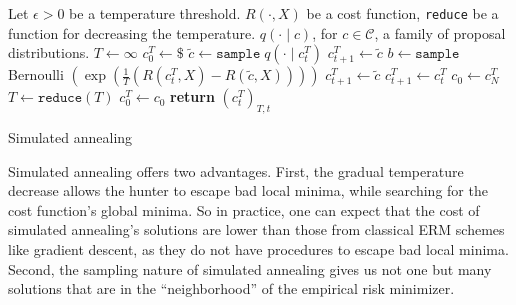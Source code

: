 \begin{algorithm}
\begin{algorithmic}[1]
\State Let
\State \quad $\epsilon > 0$ be a temperature threshold.
\State \quad $R(\cdot, X)$ be a cost function,
\State \quad \texttt{reduce} be a function for decreasing the temperature.
\State \quad $q(\cdot \mid c)$, for $c \in \mathcal{C}$, a family of proposal distributions.
\State
{}
\State $T \gets \infty$ 
\State $c^T_0 \gets \$$ 
\State $\tilde{c} \gets \texttt{sample} \; q(\cdot \mid c^T_t)$
\State $c^T_{t+1} \gets \tilde{c}$
\Else
\State $b \gets \texttt{sample}$ Bernoulli $\left(\exp\left(\frac{1}{T}\left(R(c^T_t, X)-R(\tilde{c}, X)\right)\right)\right)$
\State $c^T_{t+1} \gets \tilde{c}$
\Else
\State $c^T_{t+1} \gets c^T_t$
\EndIf
\EndIf
\EndFor
\State $c_0 \gets c^T_N$ 
\State $T \gets \texttt{reduce}(T)$
\State $c^T_0 \gets c_0$
\EndWhile
\State \textbf{return} $\left(c^T_t\right)_{T, t}$
\EndFunction
\end{algorithmic}
\caption{Simulated annealing}
\label{algo:sa_sa}
\end{algorithm}

Simulated annealing offers two advantages. First, the gradual temperature
decrease allows the hunter to escape bad local minima, while searching
for the cost function's global minima. So in practice, one can expect that
the cost of simulated annealing's solutions are lower than those from classical
ERM schemes like gradient descent, as they do not have procedures
to escape bad local minima. Second, the sampling nature of simulated annealing
gives us not one but many solutions that are in the ``neighborhood''
of the empirical risk minimizer.

